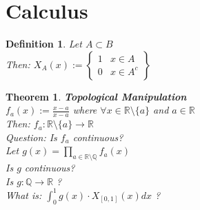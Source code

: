 \documentclass[12pt]{extarticle}
\theoremstyle{plain}
\newtheorem{thm}{Theorem}[section]
\theoremstyle{plain}
\theoremstyle{plain}
\theoremstyle{Definition}
\newtheorem{def.}{Definition}[section]
\theoremstyle{Definition}
\theoremstyle{plain}
\theoremstyle{plain}
\newcommand{\cut}[0]{\noindent\framebox[\linewidth]{\rule{\linewidth}{2pt}}\\}
\begin{document}
\section{Calculus}
\begin{def.}
	Let $A \subset B$ \\ 
	Then: $X_A(x) := \begin{Bmatrix}
	1 & x \in A \\ 
	0 & x \in A^c 
	\end{Bmatrix}$
\end{def.}
\begin{thm} \textbf{Topological Manipulation} \\
	$f_a(x) := \frac{x - a}{x - a}$ where $\forall x \in \mathbb{R} \setminus \{a\}$ and $a \in \mathbb{R}$ \\ 
	Then: $f_a : \mathbb{R} \setminus \{a\} \to \mathbb{R}$ \\ 
	Question: Is $f_a$ continuous? \\ 
	Let $g(x) = \prod_{a \in \mathbb{R} \setminus \mathbb{Q} } f_a(x)$ \\ 
	Is $g$ continuous? \\
	Is $g : \mathbb{Q} \to \mathbb{R}$ ? \\
	What is: $\int_{0}^1 g(x) \cdot X_{[0,1]}(x) dx$ ?
\end{thm}

\cut
\end{document}
